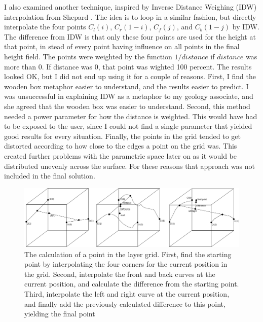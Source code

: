 \documentclass[a4paper,12pt]{report}
\begin{document}

I also examined another technique, inspired by Inverse Distance Weighing (IDW) interpolation from Shepard \cite{shepard1968two}. The idea is to loop in a similar fashion, but directly interpolate the four points $C_l(i)$, $C_r(1-i)$, $C_f(j)$, and $C_b(1-j)$ by IDW. The difference from IDW is that only these four points are used for the height at that point, in stead of every point having influence on all points in the final height field. The points were weighted by the function $1/distance$ if $distance$ was more than 0. If distance was 0, that point was wighted 100 percent. The results looked OK, but I did not end up using it for a couple of reasons. First, I find the wooden box metaphor easier to understand, and the results easier to predict. I was unsuccessful in explaining IDW as a metaphor to my geology associate, and she agreed that the wooden box was easier to understand. Second, this method needed a power parameter for how the distance is weighted. This would have had to be exposed to the user, 
since I could not find a single parameter that yielded good results for every situation. Finally, 
the points in the grid tended to get distorted according to how close to the edges a point on the grid was. This created further problems with the parametric space later on as it would be distributed unevenly across the surface. For these reasons that approach was not included in the final solution.


\begin{figure}
 \label{fig:layerCreation}
 \includegraphics[width=\linewidth]{thesis/layerCreation.pdf}
 \caption{The calculation of a point in the layer grid. First, find the starting point by interpolating the four corners for the current position in the grid. Second, interpolate the front and back curves at the current position, and calculate the difference from the starting point. Third, interpolate the left and right curve at the current position, and finally add the previously calculated difference to this point, yielding the final point}
\end{figure}
\end{document}
